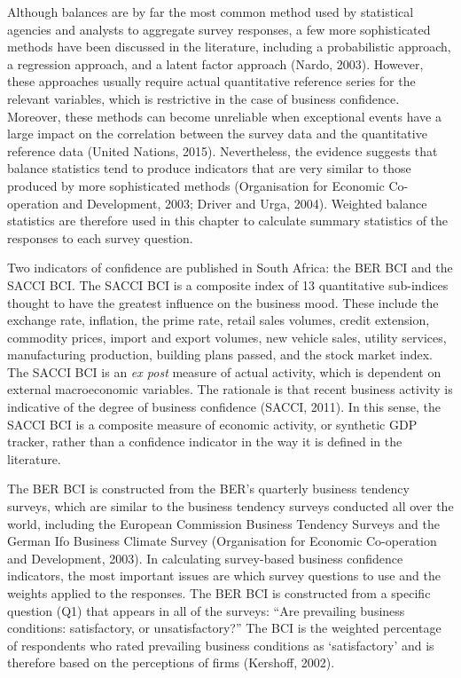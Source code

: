 \documentclass[11pt,]{article}
\begin{document}
Although balances are by far the most common method used by statistical
agencies and analysts to aggregate survey responses, a few more
sophisticated methods have been discussed in the literature, including a
probabilistic approach, a regression approach, and a latent factor
approach (Nardo, 2003). However, these approaches usually require actual
quantitative reference series for the relevant variables, which is
restrictive in the case of business confidence. Moreover, these methods
can become unreliable when exceptional events have a large impact on the
correlation between the survey data and the quantitative reference data
(United Nations, 2015). Nevertheless, the evidence suggests that balance
statistics tend to produce indicators that are very similar to those
produced by more sophisticated methods (Organisation for Economic
Co-operation and Development, 2003; Driver and Urga, 2004). Weighted
balance statistics are therefore used in this chapter to calculate
summary statistics of the responses to each survey question.

Two indicators of confidence are published in South Africa: the BER BCI
and the SACCI BCI. The SACCI BCI is a composite index of 13 quantitative
sub-indices thought to have the greatest influence on the business mood.
These include the exchange rate, inflation, the prime rate, retail sales
volumes, credit extension, commodity prices, import and export volumes,
new vehicle sales, utility services, manufacturing production, building
plans passed, and the stock market index. The SACCI BCI is an \emph{ex
post} measure of actual activity, which is dependent on external
macroeconomic variables. The rationale is that recent business activity
is indicative of the degree of business confidence (SACCI, 2011). In
this sense, the SACCI BCI is a composite measure of economic activity,
or synthetic GDP tracker, rather than a confidence indicator in the way
it is defined in the literature.

The BER BCI is constructed from the BER's quarterly business tendency
surveys, which are similar to the business tendency surveys conducted
all over the world, including the European Commission Business Tendency
Surveys and the German Ifo Business Climate Survey (Organisation for
Economic Co-operation and Development, 2003). In calculating
survey-based business confidence indicators, the most important issues
are which survey questions to use and the weights applied to the
responses. The BER BCI is constructed from a specific question (Q1) that
appears in all of the surveys: ``Are prevailing business conditions:
satisfactory, or unsatisfactory?'' The BCI is the weighted percentage of
respondents who rated prevailing business conditions as `satisfactory'
and is therefore based on the perceptions of firms (Kershoff, 2002).
\end{document}
